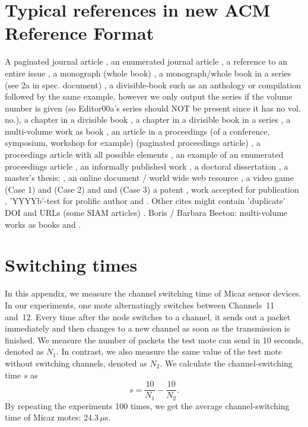 \section{Typical references in new ACM Reference Format}
A paginated journal article \cite{Abril07}, an enumerated
journal article \cite{Cohen07}, a reference to an entire issue \cite{JCohen96},
a monograph (whole book) \cite{Kosiur01}, a monograph/whole book in a series (see 2a in spec. document)
\cite{Harel79}, a divisible-book such as an anthology or compilation \cite{Editor00}
followed by the same example, however we only output the series if the volume number is given
\cite{Editor00a} (so Editor00a's series should NOT be present since it has no vol. no.),
a chapter in a divisible book \cite{Spector90}, a chapter in a divisible book
in a series \cite{Douglass98}, a multi-volume work as book \cite{Knuth97},
an article in a proceedings (of a conference, symposium, workshop for example)
(paginated proceedings article) \cite{Andler79}, a proceedings article
with all possible elements \cite{Smith10}, an example of an enumerated
proceedings article \cite{VanGundy07},
an informally published work \cite{Harel78}, a doctoral dissertation \cite{Clarkson85},
a master's thesis: \cite{anisi03}, an online document / world wide web
resource \cite{Thornburg01, Ablamowicz07, Poker06}, a video game (Case 1) \cite{Obama08} and (Case 2) \cite{Novak03}
and \cite{Lee05} and (Case 3) a patent \cite{JoeScientist001},
work accepted for publication \cite{rous08}, 'YYYYb'-test for prolific author
\cite{SaeediMEJ10} and \cite{SaeediJETC10}. Other cites might contain
'duplicate' DOI and URLs (some SIAM articles) \cite{Kirschmer:2010:AEI:1958016.1958018}.
Boris / Barbara Beeton: multi-volume works as books
\cite{MR781536} and \cite{MR781537}.

\appendix
\section{Switching times}

In this appendix, we measure the channel switching time of Micaz
\cite{CROSSBOW} sensor devices.  In our experiments, one mote
alternatingly switches between Channels~11 and~12. Every time after
the node switches to a channel, it sends out a packet immediately and
then changes to a new channel as soon as the transmission is finished.
We measure the number of packets the test mote can send in 10 seconds,
denoted as $N_{1}$. In contrast, we also measure the same value of the
test mote without switching channels, denoted as $N_{2}$. We calculate
the channel-switching time $s$ as
\begin{displaymath}%
s=\frac{10}{N_{1}}-\frac{10}{N_{2}}.
\end{displaymath}%
By repeating the experiments 100 times, we get the average
channel-switching time of Micaz motes: 24.3\,$\mu$s.

